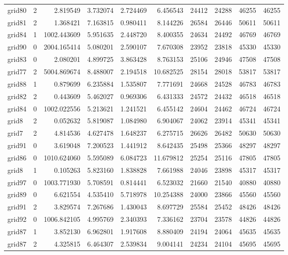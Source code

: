 \begin{longtable}{|l|r|r|r|r|r|r|r|r|r|}
grid80 & 2 & 2.819549 & 3.732074 & 2.724469 & 6.456543 & 24412 & 24288 & 46255 & 46255 \\
grid81 & 2 & 1.368421 & 7.163815 & 0.980411 & 8.144226 & 26584 & 26446 & 50611 & 50611 \\
grid84 & 1 & 1002.443609 & 5.951635 & 2.448720 & 8.400355 & 24634 & 24492 & 46769 & 46769 \\
grid90 & 0 & 2004.165414 & 5.080201 & 2.590107 & 7.670308 & 23952 & 23818 & 45330 & 45330 \\
grid83 & 0 & 2.080201 & 4.899725 & 3.863428 & 8.763153 & 25106 & 24946 & 47508 & 47508 \\
grid77 & 2 & 5004.869674 & 8.488007 & 2.194518 & 10.682525 & 28154 & 28018 & 53817 & 53817 \\
grid88 & 1 & 0.879699 & 6.235884 & 1.535807 & 7.771691 & 24668 & 24528 & 46783 & 46783 \\
grid82 & 2 & 0.443609 & 5.462027 & 0.969306 & 6.431333 & 24572 & 24432 & 46518 & 46518 \\
grid84 & 0 & 1002.022556 & 5.213621 & 1.241521 & 6.455142 & 24604 & 24462 & 46724 & 46724 \\
grid8 & 2 & 0.052632 & 5.819087 & 1.084980 & 6.904067 & 24062 & 23914 & 45341 & 45341 \\
grid7 & 2 & 4.814536 & 4.627478 & 1.648237 & 6.275715 & 26626 & 26482 & 50630 & 50630 \\
grid91 & 0 & 3.619048 & 7.200523 & 1.441912 & 8.642435 & 25498 & 25366 & 48297 & 48297 \\
grid86 & 0 & 1010.624060 & 5.595089 & 6.084723 & 11.679812 & 25254 & 25116 & 47805 & 47805 \\
grid8 & 1 & 0.105263 & 5.823160 & 1.838828 & 7.661988 & 24046 & 23898 & 45317 & 45317 \\
grid97 & 0 & 1003.771930 & 5.708591 & 0.814441 & 6.523032 & 21660 & 21540 & 40880 & 40880 \\
grid89 & 0 & 6.621554 & 4.535410 & 5.718978 & 10.254388 & 24000 & 23866 & 45560 & 45560 \\
grid91 & 2 & 3.829574 & 7.267686 & 1.430043 & 8.697729 & 25584 & 25452 & 48426 & 48426 \\
grid92 & 0 & 1006.842105 & 4.995769 & 2.340393 & 7.336162 & 23704 & 23578 & 44826 & 44826 \\
grid87 & 1 & 3.852130 & 6.962801 & 1.917608 & 8.880409 & 24194 & 24064 & 45635 & 45635 \\
grid87 & 2 & 4.325815 & 6.464307 & 2.539834 & 9.004141 & 24234 & 24104 & 45695 & 45695 \\

\end{longtable}
